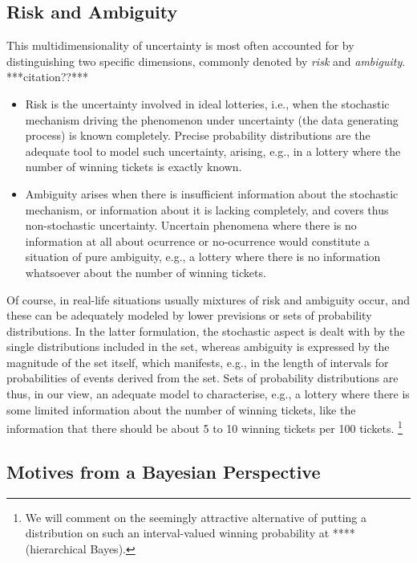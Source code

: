\subsection{Risk and Ambiguity}
\label{sec:motivation-riskambiguity}

This multidimensionality of uncertainty is most often accounted for
by distinguishing two specific dimensions,
commonly denoted by \emph{risk} and \emph{ambiguity}. ***citation??***
\begin{itemize}
\item Risk is the uncertainty involved in ideal lotteries,
i.e., when the stochastic mechanism driving the phenomenon under uncertainty
(the data generating process) is known completely.
Precise probability distributions are the adequate tool to model such uncertainty,
arising, e.g., in a lottery where the number of winning tickets is exactly known.
\item Ambiguity arises when there is insufficient information about the stochastic mechanism,
or information about it is lacking completely, and covers thus non-stochastic uncertainty.
Uncertain phenomena where there is no information at all
about ocurrence or no-ocurrence would constitute a situation of pure ambiguity,
e.g., a lottery where there is no information whatsoever about the number of winning tickets.
\end{itemize}

Of course, in real-life situations usually mixtures of risk and ambiguity occur,
and these can be adequately modeled by lower previsions or sets of probability distributions.
In the latter formulation,
the stochastic aspect is dealt with by the single distributions included in the set,
whereas ambiguity is expressed by the magnitude of the set itself,
which manifests, e.g., in the length of intervals for probabilities of events derived from the set.
Sets of probability distributions are thus, in our view,
an adequate model to characterise, e.g.,
a lottery where there is some limited information about the number of winning tickets,
like the information that there should be about 5 to 10 winning tickets per 100 tickets.%
\footnote{We will comment on the seemingly attractive alternative
of putting a distribution on such an interval-valued winning probability at **** (hierarchical Bayes).}


\subsection{Motives from a Bayesian Perspective}
\label{sec:motivation:bayesian}

